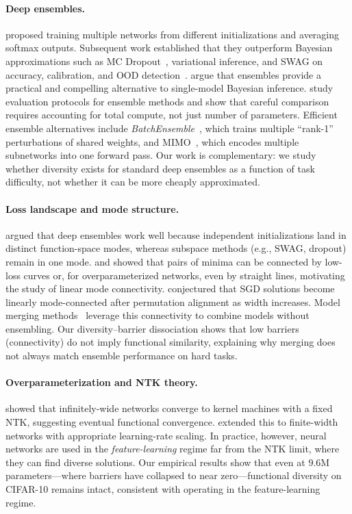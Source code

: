 \documentclass[11pt]{article}
\begin{document}
\paragraph{Deep ensembles.}
\citet{lakshminarayanan2017simple} proposed training multiple networks
from different initializations and averaging softmax outputs.  Subsequent
work established that they outperform Bayesian approximations such as
MC Dropout~\citep{gal2016dropout}, variational inference, and SWAG on
accuracy, calibration, and OOD detection~\citep{ovadia2019can,gustafsson2020evaluating}.
\citet{wilson2020case} argue that ensembles provide a practical and
compelling alternative to single-model Bayesian inference.
\citet{ashukha2020pitfalls} study evaluation protocols for ensemble
methods and show that careful comparison requires accounting for total
compute, not just number of parameters.  Efficient ensemble alternatives
include \emph{BatchEnsemble}~\citep{wen2020batchensemble}, which trains
multiple ``rank-1'' perturbations of shared weights, and MIMO~\citep{havasi2021training},
which encodes multiple subnetworks into one forward pass.  Our work is
complementary: we study whether diversity exists for standard deep
ensembles as a function of task difficulty, not whether it can be
more cheaply approximated.

\paragraph{Loss landscape and mode structure.}
\citet{fort2019deep} argued that deep ensembles work well because
independent initializations land in distinct function-space modes,
whereas subspace methods (e.g., SWAG, dropout) remain in one mode.
\citet{garipov2018loss} and \citet{frankle2020linear} showed that pairs of
minima can be connected by low-loss curves or, for overparameterized
networks, even by straight lines, motivating the study of linear mode
connectivity.  \citet{entezari2022role} conjectured that SGD solutions
become linearly mode-connected after permutation alignment as width
increases.  Model merging methods~\citep{wortsman2022model} leverage
this connectivity to combine models without ensembling.  Our
diversity--barrier dissociation shows that low barriers (connectivity)
do not imply functional similarity, explaining why merging does not
always match ensemble performance on hard tasks.

\paragraph{Overparameterization and NTK theory.}
\citet{jacot2018neural} showed that infinitely-wide networks converge to
kernel machines with a fixed NTK, suggesting eventual functional
convergence.  \citet{lee2019wide} extended this to finite-width networks
with appropriate learning-rate scaling.  In practice, however,
neural networks are used in the \emph{feature-learning} regime far from
the NTK limit, where they can find diverse solutions.  Our empirical
results show that even at 9.6M parameters---where barriers have collapsed
to near zero---functional diversity on CIFAR-10 remains intact, consistent
with operating in the feature-learning regime.
\end{document}
